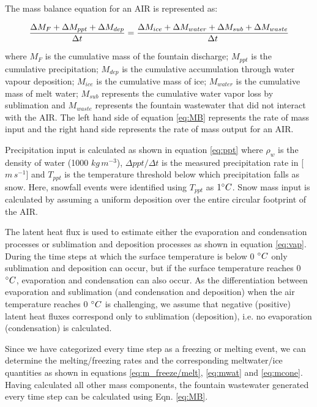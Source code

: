 \documentclass[utf8]{frontiersSCNS}
\begin{document}
The mass balance equation for an AIR is represented as:

\begin{equation}
	\frac{\Delta M_{F} + \Delta M_{ppt} + \Delta M_{dep}}{\Delta t} = \frac{\Delta M_{ice} +\Delta M_{water} +
		\Delta M_{sub} + \Delta M_{waste}}{\Delta t}  \\
	\label{eq:MB}
\end{equation}

where $M_{F}$ is the cumulative mass of the fountain discharge; $M_{ppt}$ is the cumulative precipitation;  $M_{dep}$ is the cumulative
accumulation through water vapour deposition; $M_{ice}$ is the cumulative mass of ice; $M_{water}$ is the cumulative
mass of melt water; $M_{sub}$ represents the cumulative water vapor loss by sublimation and $M_{waste}$ represents the
fountain wastewater that did not interact with the AIR. The left hand side of equation \ref{eq:MB} represents the rate of
mass input and the right hand side represents the rate of mass output for an AIR.

Precipitation input is calculated as shown in equation \ref{eq:ppt} where $\rho_{w}$ is the density of water (1000
$kg\,m^{-3}$), $\Delta ppt/ \Delta t$ is the measured precipitation rate in [$m\,s^{-1}$] and $T_{ppt}$ is the temperature threshold
below which precipitation falls as snow. Here, snowfall events were identified using $T_{ppt}$ as $1 \degree C$. Snow
mass input is calculated by assuming a uniform deposition over the entire circular footprint of the AIR.

The latent heat flux is used to estimate either the evaporation and condensation processes or sublimation and deposition
processes as shown in equation \ref{eq:vap}. During the time steps at which the surface temperature is below 0 $\degree C$ only
sublimation and deposition can occur, but if the surface temperature reaches 0 $\degree C$, evaporation and condensation
can also occur. As the differentiation between evaporation and sublimation (and condensation and deposition) when the
air temperature reaches 0 $\degree C$ is challenging, we assume that negative (positive) latent heat fluxes correspond
only to sublimation (deposition), i.e. no evaporation (condensation) is calculated.

Since we have categorized every time step as a freezing or melting event, we can determine the melting/freezing
rates and the corresponding meltwater/ice quantities as shown in equations \ref{eq:m_freeze/melt}, \ref{eq:mwat}
and \ref{eq:mcone}. Having calculated all other mass components, the fountain wastewater generated every
time step can be calculated using Eqn. \ref{eq:MB}.
\end{document}

